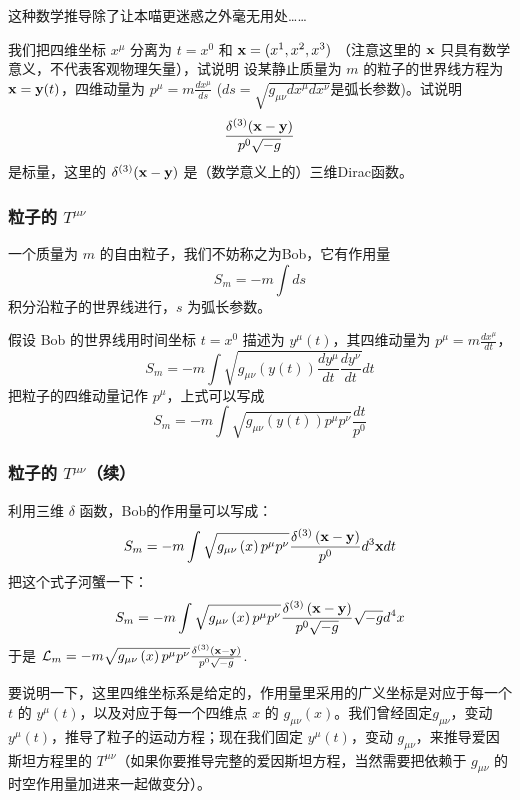 \documentclass[CJK,13pt]{beamer}
\begin{document}
  
  \begin{frame}
    \bcenter
    
    这种数学推导除了让本喵更迷惑之外毫无用处……
    \ecenter
  \end{frame}



  \begin{frame}
    我们把四维坐标 $x^\mu$ 分离为 $t=x^0$ 和 ${\mathbf{x}}=(x^1,x^2,x^3)$ （注意这里的 ${\mathbf{x}}$ 只具有数学意义，不代表客观物理矢量），试说明
    设某静止质量为 $m$ 的粒子的世界线方程为 ${\mathbf{x}} = {\mathbf{y}}(t)$，四维动量为 $p^\mu=m\frac{dx^\mu}{ds}$ ($ds=\sqrt{g_{\mu\nu}dx^\mu dx^\nu}$是弧长参数)。试说明    
    $$\frac{\delta^{(3)}({\mathbf{x}}-{\mathbf{y}})}{p^0\sqrt{-g}}$$
    是标量，这里的 $\delta^{(3)}({\mathbf{x}}-{\mathbf{y}})$ 是（数学意义上的）三维Dirac函数。

  \end{frame}
  
  
  \begin{frame}
    \frametitle{粒子的 $T^{\mu\nu}$}    
    一个质量为 $m$ 的自由粒子，我们不妨称之为Bob，它有作用量
    $$ S_m = -m \int ds $$
    积分沿粒子的世界线进行，$s$ 为弧长参数。

    \skipline

    假设 Bob 的世界线用时间坐标 $t=x^0$ 描述为 $y^\mu(t)$，其四维动量为 $p^\mu = m\frac{dx^\mu}{dt}$，
    $$ S_m = -m \int \sqrt{g_{\mu\nu}\left(y(t)\right) \frac{dy^\mu}{dt}\frac{dy^\nu}{dt}}dt$$
    把粒子的四维动量记作 $p^\mu$，上式可以写成
    $$ S_m = - m\int \sqrt{g_{\mu\nu}\left(y(t)\right) p^\mu p^\nu}\frac{dt}{p^0}$$
  \end{frame}


  \begin{frame}
    \frametitle{粒子的 $T^{\mu\nu}$（续）}    
    利用三维 $\delta$ 函数，Bob的作用量可以写成：
    $$ S_m = - m\int \sqrt{g_{\mu\nu}\left(x\right)p^\mu p^\nu} \frac{\delta^{(3)}\left({\mathbf{x}} - {\mathbf{y}}\right)}{p^0}d^3{\mathbf{x}} dt$$
    把这个式子河蟹一下：
    $$ S_m = - m\int \sqrt{g_{\mu\nu}\left(x\right)p^\mu p^\nu} \frac{\delta^{(3)}\left({\mathbf{x}} - {\mathbf{y}}\right)}{p^0\sqrt{-g}} \sqrt{-g} d^4x$$
    于是 $\mathcal{L}_m = -  m\sqrt{g_{\mu\nu}\left(x\right)p^\mu p^\nu} \frac{\delta^{(3)}\left({\mathbf{x}} - {\mathbf{y}}\right)}{p^0\sqrt{-g}}$.
    
    {\scriptsize 要说明一下，这里四维坐标系是给定的，作用量里采用的广义坐标是对应于每一个 $t$ 的 $y^\mu(t)$，以及对应于每一个四维点 $x$ 的 $g_{\mu\nu}(x)$。我们曾经固定$g_{\mu\nu}$，变动 $y^\mu(t)$，推导了粒子的运动方程；现在我们固定 $y^\mu(t)$，变动 $g_{\mu\nu}$，来推导爱因斯坦方程里的 $T^{\mu\nu}$（如果你要推导完整的爱因斯坦方程，当然需要把依赖于 $g_{\mu\nu}$ 的时空作用量加进来一起做变分）。}    
  \end{frame}
\end{document}
